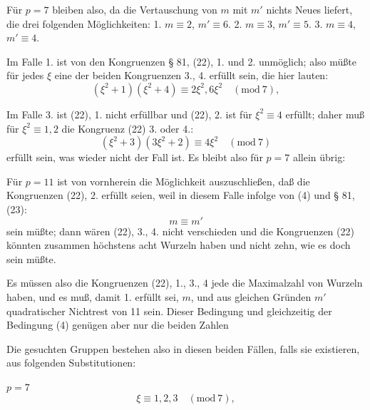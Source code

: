 
Für $p = 7$ bleiben also, da die Vertauschung von $m$ mit $m'$ nichts Neues liefert, die drei folgenden Möglichkeiten: 1. $m \equiv 2$, $m' \equiv 6$. 2. $m \equiv 3$, $m' \equiv 5$. 3. $m \equiv 4$, $m' \equiv 4$.

Im Falle 1. ist von den Kongruenzen § 81, (22), 1. und 2. unmöglich; also müßte für jedes $\xi$ eine der beiden Kongruenzen 3., 4. erfüllt sein, die hier lauten:
\[
(\xi^2 + 1)(\xi^2 + 4) \equiv 2\xi^2, 6\xi^2 \quad (\mathrm{mod}\ 7),
\]

Im Falle 3. ist (22), 1. nicht erfüllbar und (22), 2. ist für $\xi^2 \equiv 4$ erfüllt; daher muß für $\xi^2 \equiv 1, 2$ die Kongruenz (22) 3. oder 4.:
\[
(\xi^2 + 3)(3\xi^2 + 2) \equiv 4\xi^2 \quad (\mathrm{mod}\ 7)
\]
erfüllt sein, was wieder nicht der Fall ist. Es bleibt also für $p = 7$ allein übrig:

Für $p = 11$ ist von vornherein die Möglichkeit auszuschließen, daß die Kongruenzen (22), 2. erfüllt seien, weil in diesem Falle infolge von (4) und § 81, (23):
\[
m \equiv m'
\]
sein müßte; dann wären (22), 3., 4. nicht verschieden und die Kongruenzen (22) könnten zusammen höchstens acht Wurzeln haben und nicht zehn, wie es doch sein müßte.

Es müssen also die Kongruenzen (22), 1., 3., 4 jede die Maximalzahl von Wurzeln haben, und es muß, damit 1. erfüllt sei, $m$, und aus gleichen Gründen $m'$ quadratischer Nichtrest von 11 sein. Dieser Bedingung und gleichzeitig der Bedingung (4) genügen aber nur die beiden Zahlen

Die gesuchten Gruppen bestehen also in diesen beiden Fällen, falls sie existieren, aus folgenden Substitutionen:

$p = 7$
\[
\xi \equiv 1, 2, 3 \quad (\mathrm{mod}\ 7),
\]

